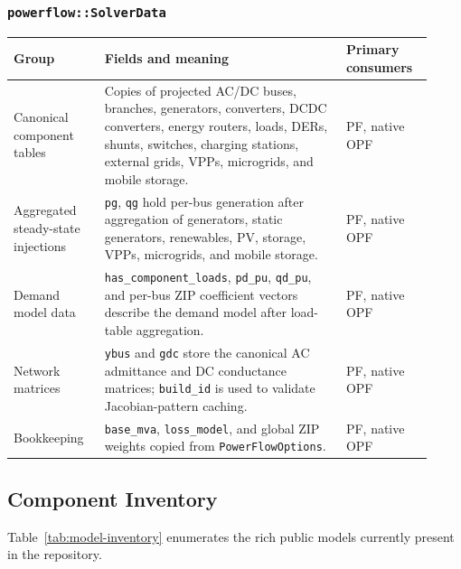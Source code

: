 \subsubsection*{\texttt{powerflow::SolverData}}
\begin{longtable}{L{0.20\linewidth}L{0.53\linewidth}L{0.19\linewidth}}
\toprule
Group & Fields and meaning & Primary consumers \\
\midrule
\endhead
Canonical component tables & Copies of projected AC/DC buses, branches, generators, converters, DCDC converters, energy routers, loads, DERs, shunts, switches, charging stations, external grids, VPPs, microgrids, and mobile storage. & PF, native OPF \\
Aggregated steady-state injections & \texttt{pg}, \texttt{qg} hold per-bus generation after aggregation of generators, static generators, renewables, PV, storage, VPPs, microgrids, and mobile storage. & PF, native OPF \\
Demand model data & \texttt{has\_component\_loads}, \texttt{pd\_pu}, \texttt{qd\_pu}, and per-bus ZIP coefficient vectors describe the demand model after load-table aggregation. & PF, native OPF \\
Network matrices & \texttt{ybus} and \texttt{gdc} store the canonical AC admittance and DC conductance matrices; \texttt{build\_id} is used to validate Jacobian-pattern caching. & PF, native OPF \\
Bookkeeping & \texttt{base\_mva}, \texttt{loss\_model}, and global ZIP weights copied from \texttt{PowerFlowOptions}. & PF, native OPF \\
\bottomrule
\end{longtable}

\subsection{Component Inventory}

Table~\ref{tab:model-inventory} enumerates the rich public models currently
present in the repository.

